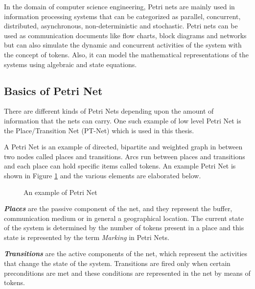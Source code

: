 In the domain of computer science engineering, Petri nets are mainly used in information processing systems that can be categorized as parallel, concurrent, distributed, asynchronous, non-deterministic and stochastic. Petri nets can be used as communication documents like flow charts, block diagrams and networks but can also simulate the dynamic and concurrent activities of the system with the concept of tokens. Also, it can model the mathematical representations of the systems using algebraic and state equations. 

\subsection{Basics of Petri Net}
There are different kinds of Petri Nets depending upon the amount of information that the nets can carry. One such example of low level Petri Net is the Place/Transition Net (PT-Net) which is used in this thesis.

A Petri Net is an example of directed, bipartite and weighted graph in between two nodes called places and transitions. Arcs run between places and transitions and each place can hold specific items called tokens. An example Petri Net is shown in Figure \ref{fig:petrinet_example} and the various elements are elaborated below.

\begin{figure}[htb!]
\centering
{}
\caption{An example of Petri Net}
\label{fig:petrinet_example}
\end{figure}

\textbf{\textit{Places}} are the passive component of the net, and they represent the buffer, communication medium or in general a geographical location. The current state of the system is determined by the number of tokens present in a place and this state is represented by the term \textit{Marking} in Petri Nets.

\textbf{\textit{Transitions}} are the active components of the net, which represent the activities that change the state of the system. Transitions are fired only when certain preconditions are met and these conditions are represented in the net by means of tokens.

